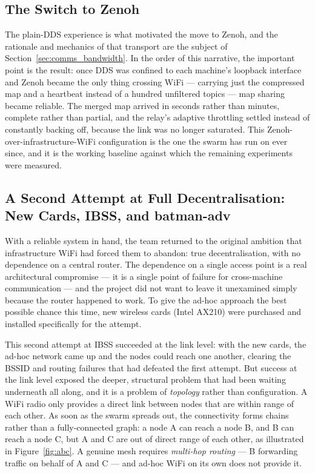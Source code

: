\subsection{The Switch to Zenoh}
\label{subsec:zenoh_switch}

The plain-DDS experience is what motivated the move to Zenoh, and the rationale and mechanics of that transport are the subject of Section~\ref{sec:comms_bandwidth}. In the order of this narrative, the important point is the result: once DDS was confined to each machine's loopback interface and Zenoh became the only thing crossing WiFi --- carrying just the compressed map and a heartbeat instead of a hundred unfiltered topics --- map sharing became reliable. The merged map arrived in seconds rather than minutes, complete rather than partial, and the relay's adaptive throttling settled instead of constantly backing off, because the link was no longer saturated. This Zenoh-over-infrastructure-WiFi configuration is the one the swarm has run on ever since, and it is the working baseline against which the remaining experiments were measured.

\subsection{A Second Attempt at Full Decentralisation: New Cards, IBSS, and batman-adv}
\label{subsec:batman}

With a reliable system in hand, the team returned to the original ambition that infrastructure WiFi had forced them to abandon: true decentralisation, with no dependence on a central router. The dependence on a single access point is a real architectural compromise --- it is a single point of failure for cross-machine communication --- and the project did not want to leave it unexamined simply because the router happened to work. To give the ad-hoc approach the best possible chance this time, new wireless cards (Intel AX210) were purchased and installed specifically for the attempt.

This second attempt at IBSS succeeded at the link level: with the new cards, the ad-hoc network came up and the nodes could reach one another, clearing the BSSID and routing failures that had defeated the first attempt. But success at the link level exposed the deeper, structural problem that had been waiting underneath all along, and it is a problem of \emph{topology} rather than configuration. A WiFi radio only provides a direct link between nodes that are within range of each other. As soon as the swarm spreads out, the connectivity forms chains rather than a fully-connected graph: a node A can reach a node B, and B can reach a node C, but A and C are out of direct range of each other, as illustrated in Figure~\ref{fig:abc}. A genuine mesh requires \emph{multi-hop routing} --- B forwarding traffic on behalf of A and C --- and ad-hoc WiFi on its own does not provide it.

